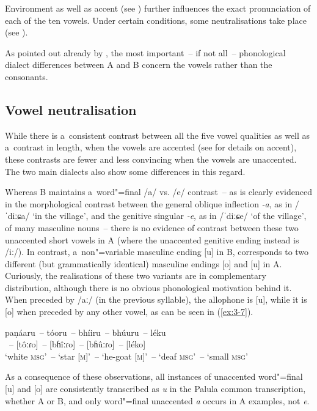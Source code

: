 Environment as well as accent (see ) further influences the exact pronunciation of each of the ten vowels. Under certain conditions, some neutralisations take place (see ). 


As pointed out already by \citet[58]{morgenstierne1932}, the most important~-- if not all~-- phonological dialect differences between A and B concern the vowels rather than the consonants. 

\subsection{Vowel neutralisation}
\label{subsec:3-2-2}

While there is a~consistent contrast between all the five vowel qualities as well as a~contrast in length, when the vowels are accented (see  for details on accent), these contrasts are fewer and less convincing when the vowels are unaccented. The two main dialects also show some differences in this regard. 


Whereas B maintains a~word"=final /a/ vs. /e/ contrast~-- as is clearly evidenced in the morphological contrast between the general oblique inflection \textit{-a}, as in /ˈdiːɕa/ `in the village', and the genitive singular \textit{-e}, as in /ˈdiːɕe/ `of the village', of many masculine nouns~-- there is no evidence of contrast between these two unaccented short vowels in A (where the unaccented genitive ending instead is /iː/). In contrast, a~non"=variable masculine ending [u] in B, corresponds to two different (but grammatically identical) masculine endings [o] and [u] in A. Curiously, the realisations of these two variants are in complementary distribution, although there is no obvious phonological motivation behind it. When preceded by /aː/ (in the previous syllable), the allophone is [u], while it is [o] when preceded by any other vowel, as can be seen in (\ref{ex:3-7}).

\begin{exe}
\ex
\label{ex:3-7}
\gll paṇáaru~-- tóoru~-- bhíiru~-- bhúuru~--  léku \\
[paɳâːɾu]~-- [tôːɾo]~-- [bɦîːɾo]~-- [bɦûːɾo]~-- [léko] \\ 
\glt `white \textsc{msg}'~-- `star [\textsc{m}]'~-- `he-goat [\textsc{m}]'~-- `deaf \textsc{msg}'~-- `small \textsc{msg}'
\end{exe}

As a consequence of these observations, all instances of unaccented word"=final [u] and [o] are consistently transcribed as \textit{u} in the Palula common transcription, whether A or B, and only word"=final unaccented \textit{a} occurs in A examples, not \textit{e}.


